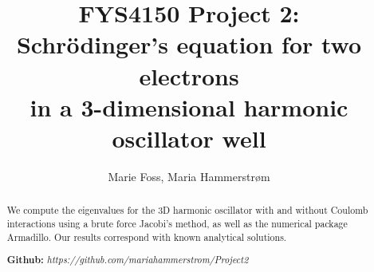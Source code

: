 \documentclass{article}
\title{\textbf{FYS4150 Project 2: \\Schr\"odinger's equation for two electrons \\in a 3-dimensional harmonic oscillator well}}
\author{Marie Foss, Maria Hammerstr{{\o}}m}
\date{} %
\begin{document}
\maketitle

\begin{abstract}
	\noindent We compute the eigenvalues for the 3D harmonic oscillator with and without Coulomb interactions using a brute force Jacobi's method, as well as the numerical package Armadillo. Our results correspond with known analytical solutions.
	\vspace*{2ex}
	
	\noindent \textbf{Github:} \textit{https://github.com/mariahammerstrom/Project2}
	\vspace*{2ex}
\end{abstract}
\end{document}

